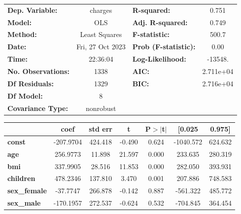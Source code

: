 \begin{center}
\begin{tabular}{lclc}
\toprule
\textbf{Dep. Variable:}    &     charges      & \textbf{  R-squared:         } &     0.751   \\
\textbf{Model:}            &       OLS        & \textbf{  Adj. R-squared:    } &     0.749   \\
\textbf{Method:}           &  Least Squares   & \textbf{  F-statistic:       } &     500.7   \\
\textbf{Date:}             & Fri, 27 Oct 2023 & \textbf{  Prob (F-statistic):} &     0.00    \\
\textbf{Time:}             &     22:36:04     & \textbf{  Log-Likelihood:    } &   -13548.   \\
\textbf{No. Observations:} &        1338      & \textbf{  AIC:               } & 2.711e+04   \\
\textbf{Df Residuals:}     &        1329      & \textbf{  BIC:               } & 2.716e+04   \\
\textbf{Df Model:}         &           8      & \textbf{                     } &             \\
\textbf{Covariance Type:}  &    nonrobust     & \textbf{                     } &             \\
\bottomrule
\end{tabular}
\begin{tabular}{lcccccc}
                           & \textbf{coef} & \textbf{std err} & \textbf{t} & \textbf{P$> |$t$|$} & \textbf{[0.025} & \textbf{0.975]}  \\
\midrule
\textbf{const}             &    -207.9704  &      424.418     &    -0.490  &         0.624        &    -1040.572    &      624.632     \\
\textbf{age}               &     256.9773  &       11.898     &    21.597  &         0.000        &      233.635    &      280.319     \\
\textbf{bmi}               &     337.9905  &       28.516     &    11.853  &         0.000        &      282.050    &      393.931     \\
\textbf{children}          &     478.2346  &      137.810     &     3.470  &         0.001        &      207.886    &      748.583     \\
\textbf{sex\_female}       &     -37.7747  &      266.878     &    -0.142  &         0.887        &     -561.322    &      485.772     \\
\textbf{sex\_male}         &    -170.1957  &      272.537     &    -0.624  &         0.532        &     -704.845    &      364.454     \\

\end{tabular}
\end{center}
